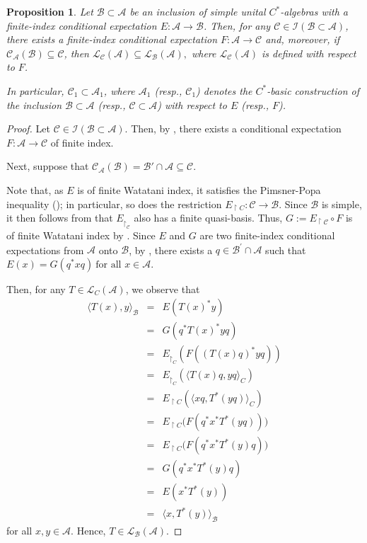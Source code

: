 \documentclass{amsart}
\numberwithin{equation}{section}
\newcommand{\mcal}{\mathcal}
\newcommand{\1}{\mathbf{1}}
\newcommand{\mA}{\mathcal{A}}
\newcommand{\mB}{\mathcal{B}}
\newcommand{\mC}{\mathcal{C}}
\newtheorem{proposition}[theorem]{Proposition}
\begin{document}
\begin{proposition}\label{LCA-in-LBA}
Let $\mB \subset \mA$ be an inclusion of simple unital
$C^{*}$-algebras with a finite-index conditional expectation $E: \mA
\rightarrow \mB$. Then, for any $\mC\in \mcal{I}(\mB \subset \mA)$,
there exists a finite-index conditional expectation $F: \mA \to \mC$
and, moreover, if $\mC_{\mA}(\mB)\subseteq \mC $, then
$\mcal{L}_{\mC}(\mA)\subseteq \mcal{L}_{\mB} (\mA),$ where
$\mcal{L}_{\mC}(\mA)$ is defined with respect to $F$.

In particular, $\mC_1 \subset \mA_1$, where $\mA_1$ (resp., $\mC_1$) denotes
the $C^*$-basic construction of the inclusion $ \mB \subset \mA$ (resp.,
$\mC \subset \mA$) with respect to $E$ (resp., $F$).
\end{proposition}

\begin{proof}
Let $\mC\in \mcal{I}(\mB \subset \mA)$. Then, by \cite[Proposition 6.1]{I},
there exists a conditional expectation $F: \mA\rightarrow \mC$ of finite
index.

Next, suppose that $\mC_{\mA}(\mB)=\mB'\cap \mA \subseteq \mC$. 

Note that, as $E$ is of finite Watatani index, it satisfies the
Pimsner-Popa inequality (\cite{Wat}); in particular, so does the restriction
$E_{\restriction C}: \mC\rightarrow \mB$.  Since $\mB$ is simple, it then follows
from \cite[Corollary 3.4]{I} that $E_{\restriction_{\mC}}$ also has a
finite quasi-basis. Thus, $G:= E_{\restriction \mC}\circ F$ is of finite
Watatani index by \cite[Proposition 1.7.1]{Wat}. Since $E$ and $G$ are
two finite-index conditional expectations from $\mA$ onto $\mB$, by
\cite[Proposition 2.10.9]{Wat}, there exists a $q\in \mB^{'}\cap \mA $
such that
$
E(x)=G(q^*xq) \  \mbox{for all } x\in \mA.
$ 

Then, for any $T\in \mcal{L}_C(\mA)$, we observe that
\begin{eqnarray*}
\langle T(x),y\rangle_{\mB} &=& E(T(x)^{*}y)\\
& = & G(q^{*}T(x)^{*}yq)\\
&=& E_{\restriction_C}(F((T(x)q)^{*}yq)) \\
& = & E_{\restriction_C}(\langle T(x)q, yq\rangle_{C}) \\
& = & E_{\restriction C}(\langle xq,T^{*}(yq)\rangle_{C}) \\
&=& E_{\restriction C}\big(F(q^*x^*T^{*}(yq))\big)\\
& = & E_{\restriction C}\big(F(q^*x^*T^{*}(y)q)\big)\\
&=& G(q^*x^*T^{*}(y)q) \\
& = & E(x^*T^{*}(y))\\
& = & \langle x,T^*(y)\rangle_{\mB}
\end{eqnarray*}
for all $x,y\in \mA$. Hence, $T\in \mcal{L}_{\mB}(\mA)$.
\end{proof}
\end{document}
